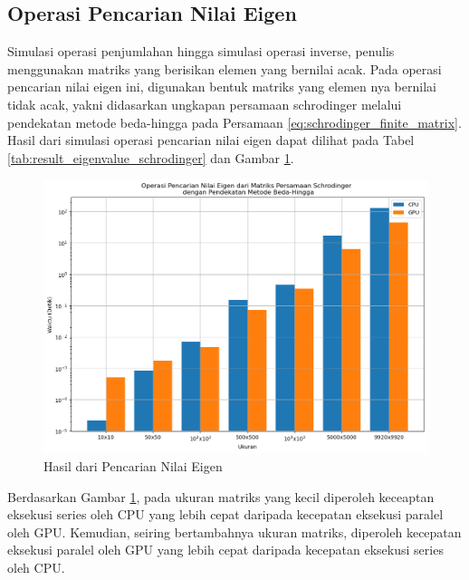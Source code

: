 \subsection{Operasi Pencarian Nilai Eigen}

Simulasi operasi penjumlahan hingga simulasi operasi inverse, penulis menggunakan matriks yang berisikan elemen yang bernilai acak. Pada operasi pencarian nilai eigen ini, digunakan bentuk matriks yang elemen nya bernilai tidak acak, yakni didasarkan ungkapan persamaan schrodinger melalui pendekatan metode beda-hingga pada Persamaan \ref{eq:schrodinger_finite_matrix}. Hasil dari simulasi operasi pencarian nilai eigen dapat dilihat pada Tabel \ref{tab:result_eigenvalue_schrodinger} dan Gambar \ref{img:result_eigenvalue_schrodinger}.

\begin{figure}[H]
	\centering
	\includegraphics[width=14cm, scale=1]{images/penelitian/eigenvalue-schrodinger.png}
	\caption{Hasil dari Pencarian Nilai Eigen}
	\label{img:result_eigenvalue_schrodinger}
\end{figure}

Berdasarkan Gambar \ref{img:result_eigenvalue_schrodinger}, pada ukuran matriks yang kecil diperoleh keceaptan eksekusi series oleh CPU yang lebih cepat daripada kecepatan eksekusi paralel oleh GPU. Kemudian, seiring bertambahnya ukuran matriks, diperoleh kecepatan eksekusi paralel oleh GPU yang lebih cepat daripada kecepatan eksekusi series oleh CPU.

